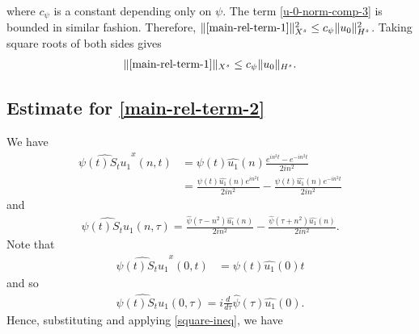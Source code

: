 \documentclass[12pt,reqno]{amsart}
\numberwithin{equation}{section}  %
\newcommand{\wh}{\widehat}
\begin{document}
%
%
where $c_{\psi}$ is a constant depending only on $\psi$. The
term \eqref{u-0-norm-comp-3} is bounded in similar fashion. Therefore, 
$\|\eqref{main-rel-term-1}\|_{X^{s}}^{2} \le c_{\psi}
\|u_{0}\|_{H^s}^2$. Taking square roots of both sides gives
%
%
\begin{equation}
  \begin{split}
    \|\eqref{main-rel-term-1}\|_{X^{s}} \le c_{\psi}
    \|u_{0}\|_{H^s}.
  \end{split}
  \label{eqn:u-0-fin-est}
\end{equation}
%
%
%
%
\subsection{Estimate for \eqref{main-rel-term-2}}
\label{ssec:est-init-term-2}
We have
%
%
\begin{equation*}
  \begin{split}
    \wh{\psi(t)S_{t}u_{1}}^{x}(n, t)
    & = \psi(t) \wh{u_{1}}(n) \frac{e^{in^2 t} - e^{-in^{2}t}}{2i n^{2}}
    \\
    & = \frac{\psi(t) \wh{u_{1}}(n)e^{in^{2}t}}{2i n^{2}} - \frac{\psi(t)
    \wh{u_{1}}(n)e^{-in^{2}t}}{2i n^{2}}  
  \end{split}
\end{equation*}
%
%
and
%
%
\begin{equation*}
  \begin{split}
    \wh{\psi(t) S_{t}u_{1}}(n, \tau) = \frac{\wh{\psi}(\tau -
    n^{2})\wh{u_{1}}(n)}{2i n^{2}} - \frac{\wh{\psi}(\tau + n^{2})\wh{u_{1}}(n)}{2i
    n^{2}}.
  \end{split}
\end{equation*}
%
Note that 
%
\begin{equation*}
  \begin{split}
    \wh{\psi(t)S_{t}u_{1}}^{x}(0, t)
    & = \psi(t) \wh{u_{1}}(0) t
      \end{split}
\end{equation*}
and so 
%
%
\begin{equation*}
  \begin{split}
    \wh{\psi(t) S_{t}u_{1}}(0, \tau) = i \frac{d}{d \tau} \wh{\psi}(\tau)
    \wh{u_{1}}(0).
  \end{split}
\end{equation*}
%
Hence, substituting and applying \eqref{square-ineq}, we have
%
%
\end{document}

